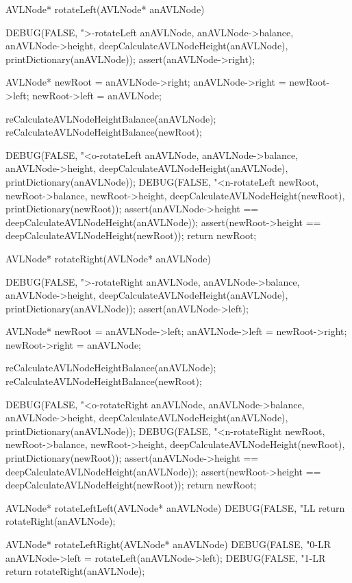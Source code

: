 AVLNode* rotateLeft(AVLNode* anAVLNode) {
  DEBUG(FALSE, ">-rotateLeft %
        anAVLNode, anAVLNode->balance, anAVLNode->height,
        deepCalculateAVLNodeHeight(anAVLNode),
        printDictionary(anAVLNode));
  assert(anAVLNode->right);

  AVLNode* newRoot = anAVLNode->right;
  anAVLNode->right = newRoot->left;
  newRoot->left    = anAVLNode;

  reCalculateAVLNodeHeightBalance(anAVLNode);
  reCalculateAVLNodeHeightBalance(newRoot);

  DEBUG(FALSE, "<o-rotateLeft %
        anAVLNode, anAVLNode->balance, anAVLNode->height,
        deepCalculateAVLNodeHeight(anAVLNode),
        printDictionary(anAVLNode));
  DEBUG(FALSE, "<n-rotateLeft %
        newRoot, newRoot->balance, newRoot->height,
        deepCalculateAVLNodeHeight(newRoot),
        printDictionary(newRoot));
  assert(anAVLNode->height == deepCalculateAVLNodeHeight(anAVLNode));
  assert(newRoot->height == deepCalculateAVLNodeHeight(newRoot));
  return newRoot;
}

AVLNode* rotateRight(AVLNode* anAVLNode) {
  DEBUG(FALSE, ">-rotateRight %
        anAVLNode, anAVLNode->balance, anAVLNode->height,
        deepCalculateAVLNodeHeight(anAVLNode),
        printDictionary(anAVLNode));
  assert(anAVLNode->left);

  AVLNode* newRoot = anAVLNode->left;
  anAVLNode->left = newRoot->right;
  newRoot->right  = anAVLNode;

  reCalculateAVLNodeHeightBalance(anAVLNode);
  reCalculateAVLNodeHeightBalance(newRoot);

  DEBUG(FALSE, "<o-rotateRight %
        anAVLNode, anAVLNode->balance, anAVLNode->height,
        deepCalculateAVLNodeHeight(anAVLNode),
        printDictionary(anAVLNode));
  DEBUG(FALSE, "<n-rotateRight %
        newRoot, newRoot->balance, newRoot->height,
        deepCalculateAVLNodeHeight(newRoot),
        printDictionary(newRoot));
  assert(anAVLNode->height == deepCalculateAVLNodeHeight(anAVLNode));
  assert(newRoot->height == deepCalculateAVLNodeHeight(newRoot));
  return newRoot;
}

AVLNode* rotateLeftLeft(AVLNode* anAVLNode) {
  DEBUG(FALSE, "LL %
  return rotateRight(anAVLNode);
}

AVLNode* rotateLeftRight(AVLNode* anAVLNode) {
  DEBUG(FALSE, "0-LR %
  anAVLNode->left = rotateLeft(anAVLNode->left);
  DEBUG(FALSE, "1-LR %
  return rotateRight(anAVLNode);
}

